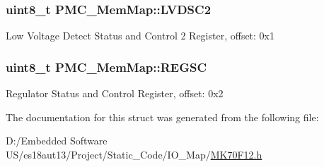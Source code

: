 \subsubsection[{L\+V\+D\+S\+C2}]{\setlength{\rightskip}{0pt plus 5cm}uint8\+\_\+t P\+M\+C\+\_\+\+Mem\+Map\+::\+L\+V\+D\+S\+C2}\label{struct_p_m_c___mem_map_a934db8b39dae8b99a9a9165df50145f5}
Low Voltage Detect Status and Control 2 Register, offset\+: 0x1 \hypertarget{struct_p_m_c___mem_map_aa14a55a46cc237589d6c01ebf7676c2a}{}
\subsubsection[{R\+E\+G\+S\+C}]{\setlength{\rightskip}{0pt plus 5cm}uint8\+\_\+t P\+M\+C\+\_\+\+Mem\+Map\+::\+R\+E\+G\+S\+C}\label{struct_p_m_c___mem_map_aa14a55a46cc237589d6c01ebf7676c2a}
Regulator Status and Control Register, offset\+: 0x2 

The documentation for this struct was generated from the following file\+:\begin{DoxyCompactItemize}
\item 
D\+:/\+Embedded Software U\+S/es18aut13/\+Project/\+Static\+\_\+\+Code/\+I\+O\+\_\+\+Map/\hyperlink{_m_k70_f12_8h}{M\+K70\+F12.\+h}\end{DoxyCompactItemize}
